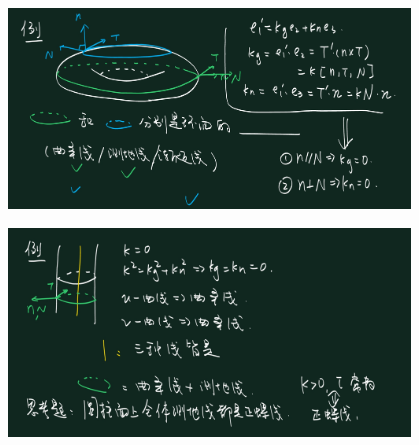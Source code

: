 \documentclass[lang=cn,10pt,thmcnt=section]{elegantbook}
\begin{document}
\includegraphics[width=0.8\textwidth]{figure/例题1.png}

\includegraphics[width=0.8\textwidth]{figure/例题2.png}
\end{document}
